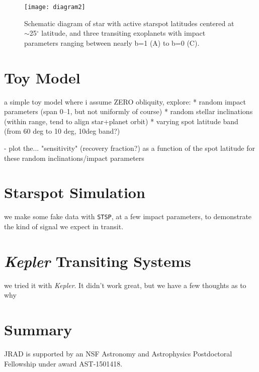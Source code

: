 \documentclass[preprint2]{aastex61}
\newcommand{\Kepler}{\textsl{Kepler}\xspace}
\begin{document}
\begin{figure}[!t]
\centering
\texttt{[image: diagram2]}
\caption{
Schematic diagram of star with active starspot latitudes centered at $\sim$25$^\circ$ latitude, and three transiting exoplanets with impact parameters ranging between nearly b=1 (A) to  b=0 (C).
}
\label{fig:diagram2}
\end{figure}


\section{Toy Model}
a simple toy model where i assume ZERO obliquity, explore:
* random impact parameters (span 0--1, but not uniformly of course)
* random stellar inclinations (within range, tend to align star+planet orbit)
* varying spot latitude band (from 60 deg to 10 deg, 10deg band?)

- plot the... "sensitivity" (recovery fraction?) as a function of the spot latitude for these random inclinations/impact parameters


\section{Starspot Simulation}
we make some fake data with {\tt STSP}, at a few impact parameters, to demonstrate the kind of signal we expect in transit.


\section{\Kepler Transiting Systems}
we tried it with \Kepler. It didn't work great, but we have a few thoughts as to why




\section{Summary}
\label{sec:summary}


\acknowledgments

JRAD is supported by an NSF Astronomy and Astrophysics Postdoctoral Fellowship under award AST-1501418. 



\end{document}
